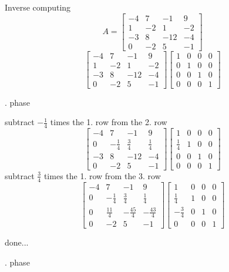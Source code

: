 \documentclass[12pt]{article}
\begin{document}
Inverse computing
$$ A=\left[{\begin{array}{cccc}-4& 7& -1& 9\\ 1& -2& 1& -2\\ -3& 8& -12& -4\\ 0& -2& 5& -1\end{array}}\right]$$
$$\left[{\begin{array}{cccc}-4& 7& -1& 9\\ 1& -2& 1& -2\\ -3& 8& -12& -4\\ 0& -2& 5& -1\end{array}}\right]\left[{\begin{array}{cccc}1& 0& 0& 0\\ 0& 1& 0& 0\\ 0& 0& 1& 0\\ 0& 0& 0& 1\end{array}}\right]$$
\par{}. phase

subtract $-\frac{1}{4}$ times the 1. row from the 2. row
$$\left[{\begin{array}{cccc}-4& 7& -1& 9\\ 0& -\frac{1}{4}& \frac{3}{4}& \frac{1}{4}\\ -3& 8& -12& -4\\ 0& -2& 5& -1\end{array}}\right]\left[{\begin{array}{cccc}1& 0& 0& 0\\ \frac{1}{4}& 1& 0& 0\\ 0& 0& 1& 0\\ 0& 0& 0& 1\end{array}}\right]$$
subtract $\frac{3}{4}$ times the 1. row from the 3. row
$$\left[{\begin{array}{cccc}-4& 7& -1& 9\\ 0& -\frac{1}{4}& \frac{3}{4}& \frac{1}{4}\\ 0& \frac{11}{4}& -\frac{45}{4}& -\frac{43}{4}\\ 0& -2& 5& -1\end{array}}\right]\left[{\begin{array}{cccc}1& 0& 0& 0\\ \frac{1}{4}& 1& 0& 0\\ -\frac{3}{4}& 0& 1& 0\\ 0& 0& 0& 1\end{array}}\right]$$
\par\noindent done...


\par{}. phase
\end{document}
